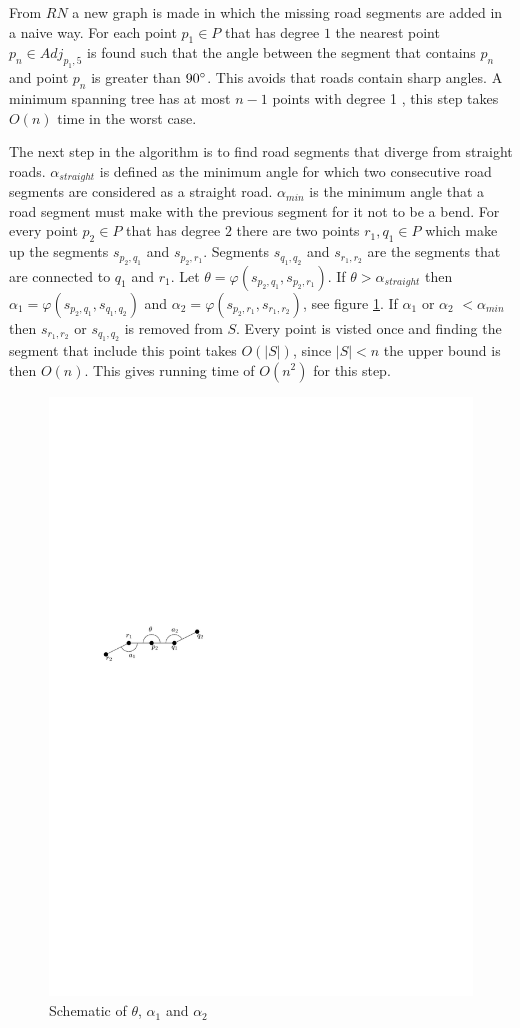 \documentclass[11pt]{article}
\begin{document}
From $RN$ a new graph is made in which the missing road segments are added in a naive way. For each point $p_1 \in P$ that has degree $1$ the nearest point $p_n \in Adj_{p_1,5}$ is found such that the angle between the segment that contains $p_n$ and point $p_n$ is greater than $90\degree$. This avoids that roads contain sharp angles. A minimum spanning tree has at most $n-1$ points with degree 1 \cite{clrs-ia-09}, this step takes $O(n)$ time in the worst case. 

The next step in the algorithm is to find road segments that diverge from straight roads. $\alpha_{straight}$ is defined as the minimum angle for which two consecutive road segments are considered as a straight road. $\alpha_{min}$ is the minimum angle that a road segment must make with the previous segment for it not to be a bend. For every point $p_2 \in P$ that has degree $2$ there are two points $r_1, q_1 \in P$ which make up the segments $s_{p_2, q_1}$ and $s_{p_2,r_1}$. Segments $s_{q_1, q_2}$ and $s_{r_1,r_2}$ are the segments that are connected to $q_1$ and $r_1$. Let $\theta=\varphi(s_{p_2, q_1},s_{p_2,r_1})$. If $\theta> \alpha_{straight}$ then $\alpha_1=\varphi(s_{p_2, q_1},s_{q_1, q_2})$ and $\alpha_2=\varphi(s_{p_2, r_1},s_{r_1, r_2})$, see figure \ref{networkremove}. If $\alpha_1$ or $\alpha_2$ $<\alpha_{min}$ then $s_{r_1, r_2}$ or $s_{q_1, q_2}$ is removed from $S$. Every point is visted once and finding the segment that include this point takes $O(|S|)$, since $|S|<n$ the upper bound is then $O(n)$. This gives running time of $O(n^2)$ for this step.

\begin{figure}[h]
\centering
  \graphicspath{ {images/}}
  \includegraphics[width=0.5\linewidth]{NetworkRemoveSegmentsDetail}
  \caption{Schematic of $\theta$, $\alpha_1$ and $\alpha_2$}
  \label{networkremove}
\end{figure}
  
\end{document}
